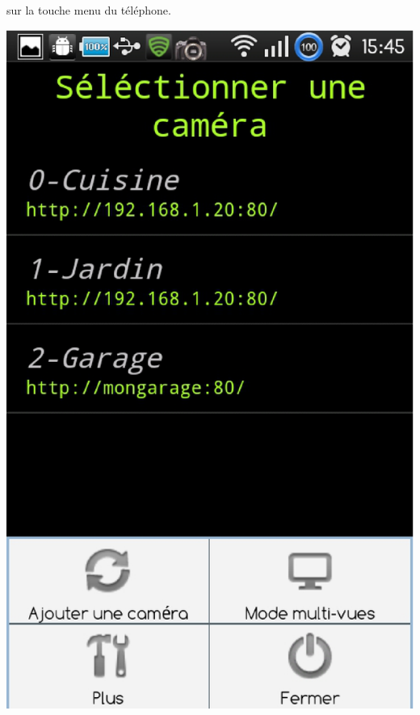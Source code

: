  sur la touche menu du téléphone.\newline
 \begin{center}
    \includegraphics[scale=0.3]{Images/homeScreenShot.eps}
\end{center}

